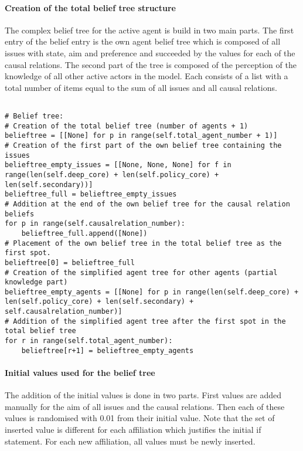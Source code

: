 \paragraph{Creation of the total belief tree structure}

The complex belief tree for the active agent is build in two main parts. The first entry of the belief entry is the own agent belief tree which is composed of all issues with state, aim and preference and succeeded by the values for each of the causal relations. The second part of the tree is composed of the perception of the knowledge of all other active actors in the model. Each consists of a list with a total number of items equal to the sum of all issues and all causal relations.

\begin{lstlisting}

# Belief tree:
# Creation of the total belief tree (number of agents + 1)
belieftree = [[None] for p in range(self.total_agent_number + 1)]
# Creation of the first part of the own belief tree containing the issues
belieftree_empty_issues = [[None, None, None] for f in range(len(self.deep_core) + len(self.policy_core) + len(self.secondary))]
belieftree_full = belieftree_empty_issues
# Addition at the end of the own belief tree for the causal relation beliefs
for p in range(self.causalrelation_number):
	belieftree_full.append([None])
# Placement of the own belief tree in the total belief tree as the first spot.
belieftree[0] = belieftree_full
# Creation of the simplified agent tree for other agents (partial knowledge part)
belieftree_empty_agents = [[None] for p in range(len(self.deep_core) + len(self.policy_core) + len(self.secondary) + self.causalrelation_number)]
# Addition of the simplified agent tree after the first spot in the total belief tree
for r in range(self.total_agent_number):
	belieftree[r+1] = belieftree_empty_agents
\end{lstlisting}

\paragraph{Initial values used for the belief tree}

The addition of the initial values is done in two parts. First values are added manually for the aim of all issues and the causal relations. Then each of these values is randomised with 0.01 from their initial value. Note that the set of inserted value is different for each affiliation which justifies the initial if statement. For each new affiliation, all values must be newly inserted.

